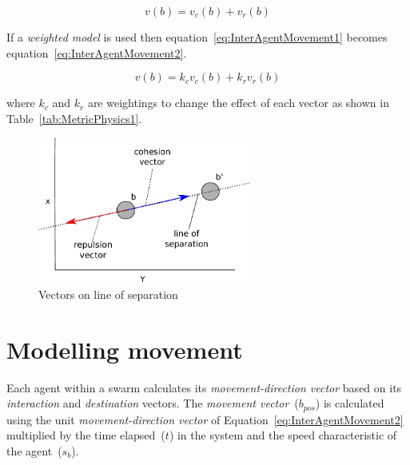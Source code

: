 \documentclass{ieeeaccess}
\begin{document}
\begin{equation}\label{eq:InterAgentMovement1}
v(b) = v_{c}(b) + v_{r}(b)
\end{equation}

If a \emph{weighted model} is used then equation~\ref{eq:InterAgentMovement1} becomes equation~\ref{eq:InterAgentMovement2}.

\begin{equation}\label{eq:InterAgentMovement2}
v(b) = k_cv_{c}(b) + k_rv_{r}(b)
\end{equation}

where $k_c$ and $k_r$ are weightings to change the effect of each vector as shown in Table~\ref{tab:MetricPhysics1}.


\begin{figure}[H]
\begin{center}
\includegraphics[width=7cm]{figures/Stability5}
\end{center}
\caption{Vectors on line of separation} \label{methods:Stability5}
\end{figure}

\section{Modelling movement}\label{sec:Movement1}
Each agent within a swarm calculates its \textit{movement-direction vector} based on its \textit{interaction} and \textit{destination} vectors. The \textit{movement vector}~($b_{pos}$) is calculated using the unit \textit{movement-direction vector} of Equation~\ref{eq:InterAgentMovement2} multiplied by the time elapsed~($t$) in the system and the speed characteristic of the agent~($s_b$).
\end{document}
